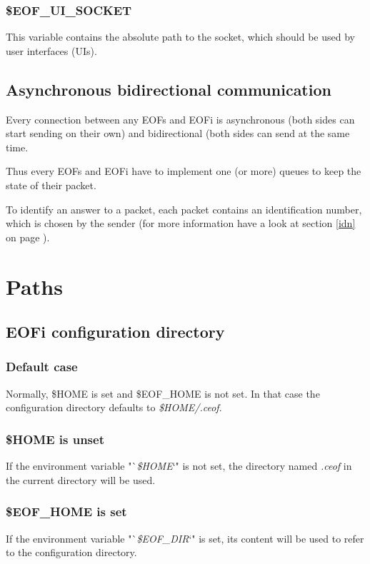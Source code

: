 \documentclass[12pt,a4paper]{book}
\begin{document}
\subsubsection{\$EOF\_UI\_SOCKET}
This variable contains the absolute path to the socket, which should be used
by user interfaces (UIs).
\subsection{Asynchronous bidirectional communication}
Every connection between any EOFs and EOFi is asynchronous (both sides
can start sending on their own) and bidirectional (both sides can send
at the same time.

Thus every EOFs and EOFi have to implement one (or more) queues to
keep the state of their packet.

To identify an answer to a packet, each packet contains an
identification number, which is chosen by the sender
(for more information have a look at section \ref{idn} on
page \pageref{idn}).
\section{Paths}
\subsection{EOFi configuration directory}
\subsubsection{Default case}
Normally, \$HOME is set and \$EOF\_HOME is not set. In that case
the configuration directory defaults to \textit{\$HOME/.ceof}.
\subsubsection{\$HOME is unset}
If the environment variable "`\textit{\$HOME}`" is not set,
the directory named \textit{.ceof} in the current directory will be used.
\subsubsection{\$EOF\_HOME is set}
If the environment variable "`\textit{\$EOF\_DIR}`" is set,
its content will be used to refer to the configuration directory.
\end{document}
